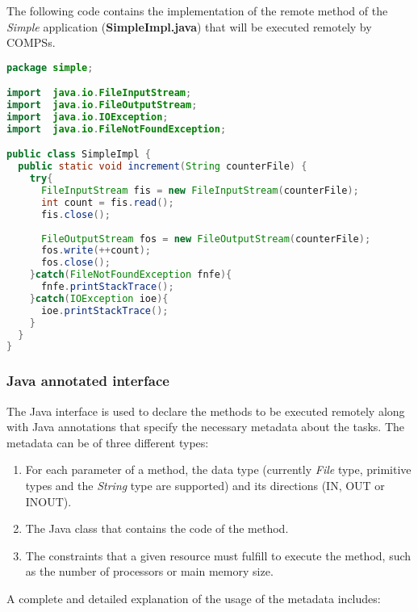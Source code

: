 The following code contains the implementation of the remote method of the {\it Simple} application ({\bf SimpleImpl.java})
that will be executed remotely by COMPSs.

\begin{lstlisting}[language=java]
package simple;

import  java.io.FileInputStream;
import  java.io.FileOutputStream;
import  java.io.IOException;
import  java.io.FileNotFoundException;

public class SimpleImpl {
  public static void increment(String counterFile) {
    try{
      FileInputStream fis = new FileInputStream(counterFile);
      int count = fis.read();
      fis.close();
      
      FileOutputStream fos = new FileOutputStream(counterFile);
      fos.write(++count);
      fos.close();
    }catch(FileNotFoundException fnfe){
      fnfe.printStackTrace();
    }catch(IOException ioe){
      ioe.printStackTrace();
    }
  }
}
\end{lstlisting}


\subsubsection{Java annotated interface}
The Java interface is used to declare the methods to be executed remotely along with Java annotations that
specify the necessary metadata about the tasks. The metadata can be of three different types:

\begin{enumerate}
 \item For each parameter of a method, the data type (currently {\it File} type, primitive types and the {\it String} type are supported) and its directions (IN, OUT or INOUT).
 \item The Java class that contains the code of the method.
 \item The constraints that a given resource must fulfill to execute the method, such as the number of processors or main memory size.
\end{enumerate}

A complete and detailed explanation of the usage of the metadata includes:

